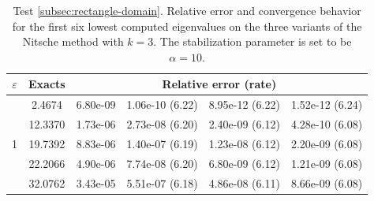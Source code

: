 \documentclass[onefignum,onetabnum,final]{siamart250211}
\numberwithin{equation}{section}
\newcommand\0{\boldsymbol{0}}
\begin{document}
\begin{table}[!hbt]
	\end{table}
	
	\begin{table}[!hbt]
		\centering
		{\setlength{\tabcolsep}{3.8pt}\footnotesize
			\caption{Test \ref{subsec:rectangle-domain}. Relative error and convergence behavior for the first six lowest computed eigenvalues on the three variants of the Nitsche method with $k=3$. The stabilization parameter is set to be $\alpha=10$.}
			\label{tabla:square-convergence-k3}
			\begin{tabular}{|c|c|cccc|}
				\hline
				$\varepsilon$& Exacts & \multicolumn{4}{c|}{Relative error (rate)} \\
				\hline
				\multirow{6}{0.02\linewidth}{1}&    2.4674 &   6.80e-09  &   1.06e-10 (6.22) &   8.95e-12 (6.22) &   1.52e-12 (6.24)   \\
				&   12.3370 &   1.73e-06  &   2.73e-08 (6.20) &   2.40e-09 (6.12) &   4.28e-10 (6.08)   \\
				&   19.7392 &   8.83e-06  &   1.40e-07 (6.19) &   1.23e-08 (6.12) &   2.20e-09 (6.08)   \\
				&   22.2066 &   4.90e-06  &   7.74e-08 (6.20) &   6.80e-09 (6.12) &   1.21e-09 (6.08)   \\
				&   32.0762 &   3.43e-05  &   5.51e-07 (6.18) &   4.86e-08 (6.11) &   8.66e-09 (6.08)   \\
				

\end{tabular}}
\end{table}
\end{document}
